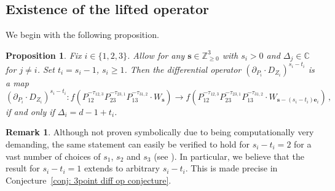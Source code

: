 \documentclass[12pt,a4paper]{extarticle}
\newtheorem{proposition}[theorem]{Proposition}
\theoremstyle{definition}
\newtheorem{remark}[theorem]{Remark}
\begin{document}
\subsection{Existence of the lifted operator}
We begin with the following proposition.

\begin{proposition}\label{prop: diff operator 1}
    Fix $i\in\{1,2,3\}$. Allow for any $\mathbf{s}\in\mathbb{Z}_{\geq 0}^3$ with $s_i>0$ and $\Delta_{j}\in\mathbb{C}$ for $j\neq i$. Set $t_i=s_i-1$, $s_i\ge1$. Then the differential operator $(\partial_{P_i}\cdot D_{Z_i})^{s_i-t_i}$ is a map    \begin{equation}\label{eqn: preserve Pij}
    (\partial_{P_i}\cdot D_{Z_i})^{s_i-t_i}:f(P^{-\tau_{12,3}}_{12}P^{-\tau_{23,1}}_{23}P^{-\tau_{31,2}}_{13}\cdot W_{\mathbf{s}})\rightarrow f(P^{-\tau_{12,3}}_{12}P^{-\tau_{23,1}}_{23}P^{-\tau_{31,2}}_{13}\cdot W_{\mathbf{s}-(s_i-t_i)\mathbf{e}_i})\,,
\end{equation}
    if and only if $\Delta_i=d-1+t_i$. 
\end{proposition}

\begin{remark}
    Although not proven symbolically due to being computationally very demanding, the same statement can easily be verified to hold for $s_i - t_i = 2$ for a vast number of choices of $s_1$, $s_2$ and $s_3$ (see \cite{zenodo}). In particular, we believe that the result for $s_i-t_i=1$ extends to arbitrary $s_i-t_i$. This is made precise in Conjecture~\ref{conj: 3point diff op conjecture}.
\end{remark}
\end{document}
